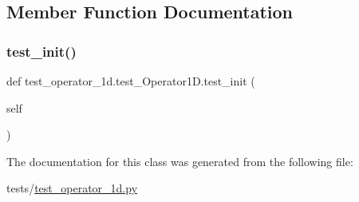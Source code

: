 \subsection{Member Function Documentation}
\mbox{\label{classtest__operator__1d_1_1test__Operator1D_a34c6a728801de7f2ca62ae5290f9e760}} 
\subsubsection{\texorpdfstring{test\+\_\+init()}{test\_init()}}
{\footnotesize\ttfamily def test\+\_\+operator\+\_\+1d.\+test\+\_\+\+Operator1\+D.\+test\+\_\+init (\begin{DoxyParamCaption}\item[{}]{self }\end{DoxyParamCaption})}



The documentation for this class was generated from the following file\+:\begin{DoxyCompactItemize}
\item 
tests/\hyperlink{test__operator__1d_8py}{test\+\_\+operator\+\_\+1d.\+py}\end{DoxyCompactItemize}
